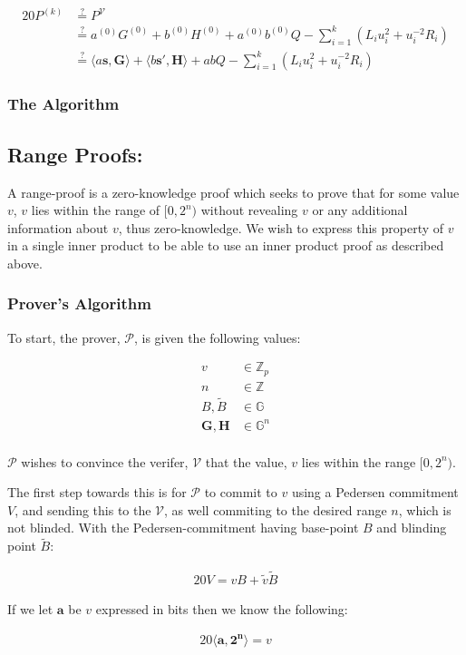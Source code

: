 \documentclass{article}
\newcommand{\eq}[1]{\begin{alignat*}{20}#1\end{alignat*}}
\newcommand{\eqn}[2]{\begin{equation}\label{#1}\begin{split}#2\end{split}\end{equation}}
\renewcommand{\vec}[1]{\boldsymbol{#1}}
\newcommand{\V}{\mathcal{V}}
\renewcommand{\P}{\mathcal{P}}
\newcommand{\G}{\mathbb{G}}
\newcommand{\Z}{\mathbb{Z}}
\newcommand{\tB}{\widetilde{B}}
\newcommand{\tv}{\widetilde{v}}
\newcommand{\dotp}[2]{\langle #1, #2 \rangle}
\begin{document}
\eq{
	P^{(k)} &\stackrel{?}{=} P^{\V} \\
	        &\stackrel{?}{=} a^{(0)}G^{(0)} + b^{(0)}H^{(0)} + a^{(0)}b^{(0)}Q - \sum^k_{i=1} (L_i u^2_i + u^{-2}_i R_i) \\
	        &\stackrel{?}{=} \dotp{a\vec{s}}{\vec{G}} + \dotp{b\vec{s'}}{\vec{H}} + abQ - \sum^k_{i=1} (L_i u^2_i + u^{-2}_i R_i)
}

\subsubsection{The Algorithm}

\subsection{Range Proofs:}\label{range-proofs}

A range-proof is a zero-knowledge proof which seeks to prove that for some value $v$, $v$ lies within the range of $[0,2^n)$ without revealing $v$ or any additional information about $v$, thus zero-knowledge. We wish to express this property of $v$ in a single inner product to be able to use an inner product proof as described above. 

\subsubsection{Prover's Algorithm}\label{prover-range-proofs}

To start, the prover, $\P$, is given the following values:

\eqn{def1}{
	v &\in \Z_p \\
	n &\in \Z\\
	B, \tB &\in \G\\
	\vec{G}, \vec{H} &\in \G^n \\
}

$\P$ wishes to convince the verifer, $\V$ that the value, $v$ lies
within the range $[0,2^n)$.

The first step towards this is for $\P$ to commit to $v$ using
a Pedersen commitment $V$, and sending this to the $\V$, as well
commiting to the desired range $n$, which is not blinded. With the
Pedersen-commitment having base-point $B$ and blinding point $\tB$:

\eq{
	V = vB + \tv \tB
}

If we let $\vec{a}$ be $v$ expressed in bits then we know the following:

\eq{
	\dotp{\vec{a}}{\vec{2^n}} = v
}
\end{document}
